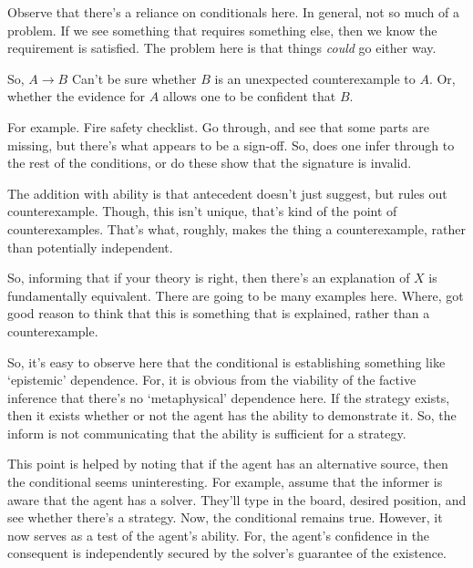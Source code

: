 \documentclass[10pt]{article}
\begin{document}
\begin{note}[Conditional]
  Observe that there's a reliance on conditionals here.
  In general, not so much of a problem.
  If we see something that requires something else, then we know the requirement is satisfied.
  The problem here is that things \emph{could} go either way.

  So, \(A \rightarrow B\)
  Can't be sure whether \(B\) is an unexpected counterexample to \(A\).
  Or, whether the evidence for \(A\) allows one to be confident that \(B\).

  For example.
  Fire safety checklist.
  Go through, and see that some parts are missing, but there's what appears to be a sign-off.
  So, does one infer through to the rest of the conditions, or do these show that the signature is invalid.

  The addition with ability is that antecedent doesn't just suggest, but rules out counterexample.
  Though, this isn't unique, that's kind of the point of counterexamples.
  That's what, roughly, makes the thing a counterexample, rather than potentially independent.

  So, informing that if your theory is right, then there's an explanation of \(X\) is fundamentally equivalent.
  There are going to be many examples here.
  Where, got good reason to think that this is something that is explained, rather than a counterexample.
\end{note}

\begin{note}
  So, it's easy to observe here that the conditional is establishing something like `epistemic' dependence.
  For, it is obvious from the viability of the factive inference that there's no `metaphysical' dependence here.
  If the strategy exists, then it exists whether or not the agent has the ability to demonstrate it.
  So, the inform is not communicating that the ability is sufficient for a strategy.

  This point is helped by noting that if the agent has an alternative source, then the conditional seems uninteresting.
  For example, assume that the informer is aware that the agent has a solver.
  They'll type in the board, desired position, and see whether there's a strategy.
  Now, the conditional remains true.
  However, it now serves as a test of the agent's ability.
  For, the agent's confidence in the consequent is independently secured by the solver's guarantee of the existence.
\end{note}
\end{document}
